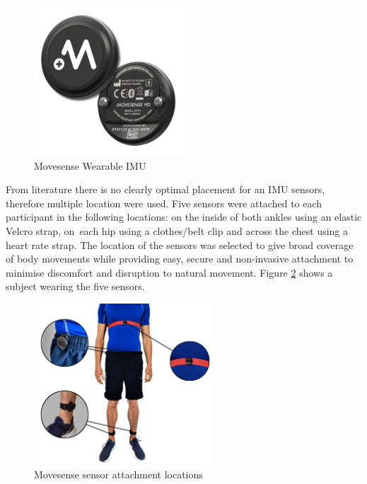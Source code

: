 \begin{figure}[!htb]
    \centering
    \includegraphics[width=0.5\textwidth]{content/3-Methods/Movesense-MD-front-and-back.png}
    \caption[Movesense Wearable IMU]{Movesense Wearable IMU\cite{movesensepress2022}}
    \label{fig:methods-movesense-sensor}
\end{figure}

From literature there is no clearly optimal placement for an IMU sensors, therefore multiple location were used. Five sensors were attached to each participant in the following locations: on the inside of both ankles using an elastic Velcro strap, on~each hip using a clothes/belt clip and across the chest using a heart rate strap. The location of the sensors was selected to give broad coverage of body movements while providing easy, secure and non-invasive attachment to minimise discomfort and disruption to natural movement. Figure \ref{fig:methods-movesense-sensor-locations} shows a subject wearing the five sensors.

\begin{figure}[!htb]
    \centering
    \includegraphics[width=0.6\textwidth]{content/3-Methods/sensor_locations.png}
    \caption[Movesense sensor attachment locations]{Movesense sensor attachment locations\cite{Sherratt2021}}
    \label{fig:methods-movesense-sensor-locations}
\end{figure}

